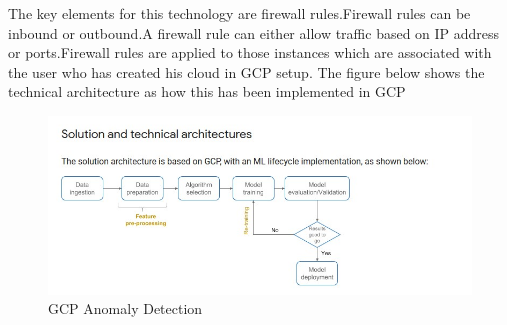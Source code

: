 The key elements for this technology are firewall rules.Firewall rules can be inbound or outbound.A firewall rule can either allow traffic based on IP address or ports.Firewall rules are applied to those instances which are associated with the user who has created his cloud in GCP setup.
The figure below shows the technical architecture as how this has been implemented in GCP \newline


\begin{figure}[h]
    \centering
    \includegraphics{texfiles/images/gcp_security_model1.jpg}
    \caption{GCP Anomaly Detection}
    \label{fig:GCP Anomaly Detection}
\end{figure}


